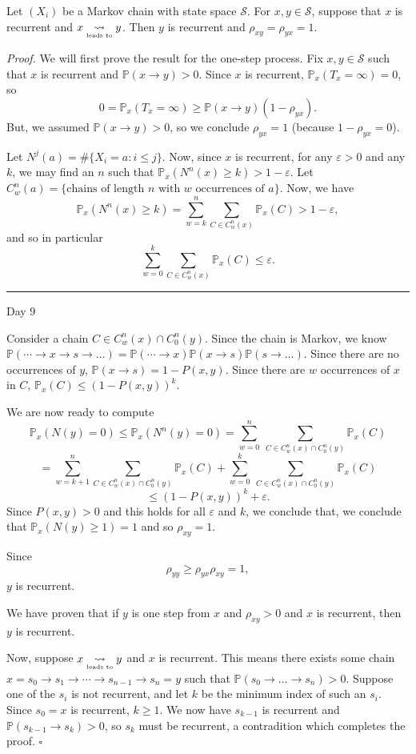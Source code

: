 \documentclass{problemset}
\newcommand{\1}{\mathbf{1}}
\renewcommand{\P}{\mathbb{P}}
\newcommand{\ldsto}{\underset{\text{\tiny leads to}}{\leadsto}}
\newcommand{\fatrule}[1]{\vspace{.3cm}\hrule {\hfill \sf #1}\par}
\newenvironment{proof}{\emph{Proof.}}{\hfill$\square$}
\begin{document}
	\begin{theorem}
		Let $(X_i)$ be a Markov chain with state space $\mathcal S$.
		For $x,y\in \mathcal S$, suppose that $x$ is recurrent and $x\ldsto y$.  Then $y$
		is recurrent and $\rho_{xy}=\rho_{yx}=1$.
	\end{theorem}
	\begin{proof}
		We will first prove the result for the one-step process.
		Fix $x,y\in\mathcal S$ such that $x$ is recurrent and $\P(x\to y)>0$.
		Since $x$ is recurrent, $\P_x(T_x=\infty) = 0$, so
		\[
			0=\P_x(T_x=\infty) \geq \P(x\to y)(1-\rho_{yx}).
		\]
		But, we assumed $\P(x\to y)>0$, so we conclude $\rho_{yx}=1$ (because $1-\rho_{yx}=0$).

		Let $N^j(a) = \#\{X_i=a: i \leq j\}$.
		Now, since $x$ is recurrent, for any $\varepsilon>0$ and any $k$, we may find an $n$ such
		that $\P_x(N^n(x)\geq k) > 1-\varepsilon$.  Let $C_w^n(a)=\{\text{chains of length $n$ with $w$ 
		occurrences of $a$}\}$.
		Now, we have
		\[
			\P_x(N^n(x)\geq k) = \sum_{w=k}^n \sum_{C\in C_w^n(x)} \P_x(C) > 1-\varepsilon,
		\]
		and so in particular
		\[
			\sum_{w=0}^k \sum_{C\in C_w^n(x)} \P_x(C) \leq \varepsilon.
		\]


	\fatrule{Day 9}
		
		Consider a chain $C\in C_w^n(x)\cap C_0^n(y)$.  Since the chain is Markov, we know
		$\P(\cdots\to x\to s\to\ldots) = \P(\cdots\to x)\P(x\to s)\P(s\to\ldots)$.  
		Since there are no occurrences of $y$, $\P(x\to s) = 1-P(x,y)$. Since there are $w$ occurrences
		of $x$ in $C$, $\P_x(C) \leq (1-P(x,y))^k$.

		We are now ready to compute
		\[
			\P_x(N(y)=0) \leq \P_x(N^n(y)=0) = \sum_{w=0}^n \ \sum_{C\in C_w^n(x)\cap C_0^n(y)} \P_x(C)
		\]\[
			=\sum_{w=k+1}^n \sum_{C\in C_w^n(x)\cap C_0^n(y)} \P_x(C)
			+\sum_{w=0}^k \ \sum_{C\in C_w^n(x)\cap C_0^n(y)} \P_x(C)
		\]\[
			\leq (1-P(x,y))^k + \varepsilon.
		\]
		Since $P(x,y)>0$ and this holds for all $\varepsilon$ and $k$, we conclude that, we conclude that 
		$\P_x(N(y)\geq 1)=1$ and so $\rho_{xy}=1$.

		Since 
		\[
			\rho_{yy} \geq \rho_{yx}\rho_{xy}=1,
		\]
		$y$ is recurrent.
		
		We have proven that if $y$ is one step from $x$ and $\rho_{xy}>0$ and $x$ is recurrent, 
		then $y$ is recurrent.

		Now, suppose $x\ldsto y$ and $x$ is recurrent.  This means there exists some chain $x=s_0\to s_1\to\cdots \to s_{n-1}\to s_n=y$
		such that $\P(s_0\to\ldots\to s_n)>0$.  Suppose one of the $s_i$ is not recurrent, and let $k$ be the minimum
		index of such an $s_i$.  Since $s_0=x$ is recurrent, $k\geq 1$.  We now have $s_{k-1}$ is recurrent and
		$\P(s_{k-1}\to s_k) > 0$, so $s_k$ must be recurrent, a contradition which completes the proof.
	\end{proof}
\end{document}

